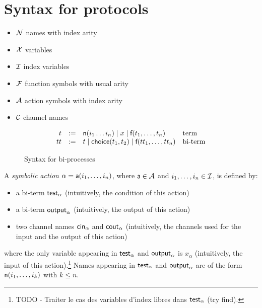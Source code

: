 \section{Syntax for protocols}

\begin{itemize}
  \item $\mathcal{N}$ names with index arity
  \item $\mathcal{X}$ variables
  \item $\mathcal{I}$ index variables
  \item $\mathcal{F}$ function symbols with usual arity
  \item $\mathcal{A}$ action symbols with index arity
  \item $\mathcal{C}$ channel names
\end{itemize}

\begin{figure}[h]
  \[
    \begin{array}{rcll}
      t & := & \textsf{n}(i_1 \dots i_n) \mid x \mid \textsf{f}(t_1,\dots,t_n) & \text{term}
      \\
      tt & := & t \mid \mathsf{choice}(t_1,t_2) \mid \textsf{f}(tt_1,\dots,tt_n) & \text{bi-term}
    \end{array}
  \]
  \caption{Syntax for bi-processes}
  \label{fig:syntax-bi-process}
\end{figure}



\begin{definition}
A \emph{symbolic action} $\alpha = \textsf{a}(i_1,\dots,i_n)$, where $\textsf{a} \in \mathcal{A}$ and $i_1,\dots,i_n \in \mathcal{I}$, is defined by:
\begin{itemize}
  \item a bi-term $\textsf{test}_{\alpha}$ (intuitively, the condition of this action)
  \item a bi-term $\textsf{output}_{\alpha}$ (intuitively, the output of this action)
  \item two channel names $\mathsf{cin}_\alpha$ and $\mathsf{cout}_\alpha$ (intuitively, the channels used for the input and the output of this action)
\end{itemize}
where the only variable appearing in $\textsf{test}_{\alpha}$ and $\textsf{output}_{\alpha}$ is $x_{\alpha}$ (intuitively, the input of this action).\footnote{TODO - Traiter le cas des variables d'index libres dans $\textsf{test}_{\alpha}$ (try find).}
Names appearing in $\textsf{test}_{\alpha}$ and $\textsf{output}_{\alpha}$ are of the form $\textsf{n}(i_1,\dots,i_k)$ with $k \leq n$.
\end{definition}

